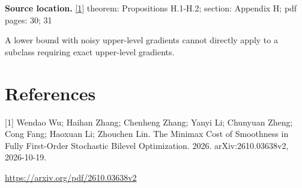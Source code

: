 \documentclass[10pt,a4paper]{article}
\begin{document}
\textbf{Source location.} \href{https://arxiv.org/pdf/2610.03638v2}{[1]} theorem: Propositions H.1-H.2; section: Appendix H; pdf pages: 30; 31

A lower bound with noisy upper-level gradients cannot directly apply to a subclass requiring exact upper-level gradients.

\section{References}
[1] Wendao Wu; Haihan Zhang; Chenheng Zhang; Yanyi Li; Chunyuan Zheng; Cong Fang; Haoxuan Li; Zhouchen Lin. The Minimax Cost of Smoothness in Fully First-Order Stochastic Bilevel Optimization. 2026. arXiv:2610.03638v2, 2026-10-19.

\url{https://arxiv.org/pdf/2610.03638v2}
\end{document}
